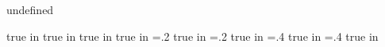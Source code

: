 \def\ifundefined#1{\expandafter\ifx\csname#1\endcsname\relax}
\def\ifdefined#1{\ifundefined{#1}\relax\else}
{\ifdefined{undefined}\fi}
\ifx\eplain\undefined  \fi 

\ifpdf
     true in
     true in
\fi
{} true in
 true in
\topmargin=.2 true in
\bottommargin=.2 true in
\leftmargin=.4 true in
\rightmargin=.4 true in

\makeatletter
\let\nobeamer@folio\folio
\def\disablepagenumbering{\def\folio{}}
\def\enablepagenumbering{\let\folio\nobeamer@folio}
\makeatother

\disablepagenumbering

\parindent=0pt

\makeatletter
\def\nobeamer@buildfont#1#2#3{%
    \expandafter\font\csname #1#2\expandafter\endcsname=cm#3}
\def\nobeamer@buildfamily#1#2#3#4{%
    \nobeamer@buildfont{#1}{rm}{r#2}%
    \nobeamer@buildfont{#1}{it}{ti#2}%
    \nobeamer@buildfont{#1}{sl}{sl#2}%
    \nobeamer@buildfont{#1}{tt}{tt#2}%
    \nobeamer@buildfont{#1}{bf}{bx#2}%
    \def\nobeamer@makemathfonts##1##2{%
        \nobeamer@buildfont{#1}{tf##1}{##2#2}%
        \nobeamer@buildfont{#1}{sf##1}{##2#3}%
        \nobeamer@buildfont{#1}{ssf##1}{##2#4}}%
    \nobeamer@makemathfonts{r}{r} %
    \nobeamer@makemathfonts{mi}{mi} %
    \nobeamer@makemathfonts{sy}{sy} %
    \nobeamer@makemathfonts{ex}{ex} %
    \nobeamer@makemathfonts{it}{ti} %
    \nobeamer@makemathfonts{sl}{sl} %
    \nobeamer@makemathfonts{bf}{bx} %
    \nobeamer@makemathfonts{tt}{tt} %
    \def\nobeamer@setfonts##1##2{%
        \expandafter\textfont##1=\csname #1tf##2\endcsname%
        \expandafter\scriptfont##1=\csname #1sf##2\endcsname%
        \expandafter\scriptscriptfont##1=\csname #1ssf##2\endcsname}%
    \def\nobeamer@oldstyle{rm}
    \expandafter\def\csname #1\endcsname{%
        \nobeamer@setfonts{0}{r}%
        \nobeamer@setfonts{1}{mi}%
        \nobeamer@setfonts{2}{sy}%
        \nobeamer@setfonts{3}{ex}%
        \nobeamer@setfonts{\noexpand\itfam}{it}%
        \nobeamer@setfonts{\noexpand\slfam}{sl}%
        \nobeamer@setfonts{\noexpand\bffam}{bf}%
        \nobeamer@setfonts{\noexpand\ttfam}{tt}%
        \def\styleswitch{\expandafter\csname #1\nobeamer@oldstyle\endcsname}%
        \def\rm{%
            \def\nobeamer@oldstyle{rm}%
            \styleswitch}%
        \def\it{%
            \def\nobeamer@oldstyle{it}%
            \styleswitch}%
        \def\sl{%
            \def\nobeamer@oldstyle{sl}%
            \styleswitch}%
        \def\bf{%
            \def\nobeamer@oldstyle{bf}%
            \styleswitch}%
        \def\tt{%
            \def\nobeamer@oldstyle{tt}%
            \styleswitch}%
        \styleswitch}%
    }

